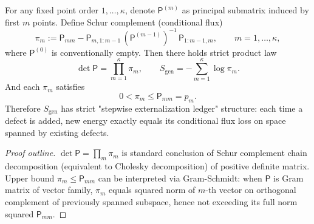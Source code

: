 \begin{proposition}\label{prop:xi-pick-poisson-schur-flux-ledger}
For any fixed point order \(1,\dots,\kappa\), denote \(\mathsf P^{(m)}\) as principal submatrix induced by first \(m\) points.
Define Schur complement (conditional flux)
\[
\pi_m
:=
\mathsf P_{mm}-\mathsf P_{m,1:m-1}\,(\mathsf P^{(m-1)})^{-1}\,\mathsf P_{1:m-1,m},
\qquad
m=1,\dots,\kappa,
\]
where \(\mathsf P^{(0)}\) is conventionally empty.
Then there holds strict product law
\[
\boxed{\;
\det\mathsf P=\prod_{m=1}^{\kappa}\pi_m,
\qquad
S_{\mathrm{gen}}=-\sum_{m=1}^{\kappa}\log\pi_m.\;}
\]
And each \(\pi_m\) satisfies
\[
\boxed{\;
0<\pi_m\le \mathsf P_{mm}=p_m.\;}
\]
Therefore \(S_{\mathrm{gen}}\) has strict "stepwise externalization ledger" structure: each time a defect is added, new energy exactly equals its conditional flux loss on space spanned by existing defects.
\end{proposition}
\begin{proof}[Proof outline]
\(\det\mathsf P=\prod_m\pi_m\) is standard conclusion of Schur complement chain decomposition (equivalent to Cholesky decomposition) of positive definite matrix.
Upper bound \(\pi_m\le \mathsf P_{mm}\) can be interpreted via Gram-Schmidt: when \(\mathsf P\) is Gram matrix of vector family, \(\pi_m\) equals squared norm of \(m\)-th vector on orthogonal complement of previously spanned subspace, hence not exceeding its full norm squared \(\mathsf P_{mm}\).
\end{proof}


